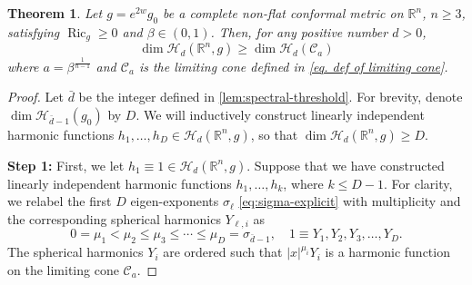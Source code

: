 \documentclass[12pt]{amsart}
\theoremstyle{plain}
\newtheorem{theorem}{Theorem}[section]
\theoremstyle{definition}
\theoremstyle{remark}     %
\numberwithin{equation}{section}
\begin{document}
\begin{theorem}\label{thm:surjective}
    Let $g=e^{2w}g_0$ be a complete non-flat conformal metric on
$\mathbb R^n$, $n\geq3$, satisfying $\operatorname{Ric}_g\geq0$ and
$\beta\in (0,1)$.  Then, for any positive number $d>0$,
\[
    \dim\mathcal H_d(\mathbb{R}^n,g)
    \geq\dim\mathcal H_d(\mathcal{C}_a)
\]
where $a=\beta^{\frac{1}{n-1}}$ and $\mathcal{C}_a$ is the limiting cone defined in \cref{eq. def of limiting cone}.
\end{theorem}
\begin{proof}
    Let $\bar{d}$ be the integer defined in \cref{lem:spectral-threshold}.
    For brevity, denote $\dim\mathcal H_{\bar{d}-1}(g_0)$ by $D$. We will inductively construct linearly independent harmonic functions $h_1,\dots, h_D\in \mathcal H_d(\mathbb{R}^n,g)$, so that
    $\dim\mathcal H_d(\mathbb{R}^n,g)
    \geq D$.

    {\bf Step 1:} First, we let $h_1\equiv 1\in \mathcal H_d(\mathbb{R}^n,g)$. Suppose that we have constructed linearly independent harmonic functions $h_1,\dots, h_k$, where $k\leq D-1$. For clarity, we relabel the first $D$ eigen-exponents $\sigma_\ell$ \cref{eq:sigma-explicit} with multiplicity and the corresponding spherical harmonics $Y_{\ell,i}$ as
    \[
        0=\mu_1<\mu_2\leq \mu_3\leq \cdots\leq \mu_D=\sigma_{\bar{d}-1},\quad 
        1\equiv Y_1,  Y_2,Y_3,\dots, Y_D.
    \]
    The spherical harmonics $Y_i$ are ordered such that $|x|^{\mu_i}Y_i$ is a harmonic function on the limiting cone $\mathcal{C}_a$.


\end{proof}
\end{document}

